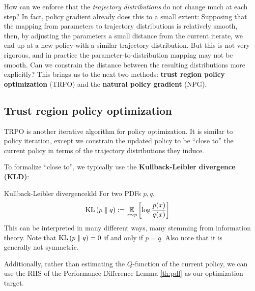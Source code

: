 \documentclass[\main/main]{subfiles}
\begin{document}
How can we enforce that the \emph{trajectory distributions} do not change much at each step?
In fact, policy gradient already does this to a small extent: Supposing that the mapping from parameters to trajectory distributions is relatively smooth, then, by adjusting the parameters a small distance from the current iterate, we end up at a new policy with a similar trajectory distribution.
But this is not very rigorous, and in practice the parameter-to-distribution mapping may not be smooth. Can we constrain the distance between the resulting distributions more explicitly?
This brings us to the next two methods: \textbf{trust region policy optimization} (TRPO) and the \textbf{natural policy gradient} (NPG).

\subsection{Trust region policy optimization}

TRPO is another iterative algorithm for policy optimization. It is similar to policy iteration, except we constrain the updated policy to be ``close to'' the current policy in terms of the trajectory distributions they induce.

To formalize ``close to'', we typically use the \textbf{Kullback-Leibler divergence (KLD)}:

\begin{definition}{Kullback-Leibler divergence}{kld}
    For two PDFs $p, q$,
    \begin{equation}
        \mathrm{KL}\left(p \parallel q\right) := \operatorname*{\mathbb{E}}_{x \sim p} \left[ \log \frac{p(x)}{q(x)} \right]
    \end{equation}
    This can be interpreted in many different ways, many stemming from information theory.
    Note that $\mathrm{KL}\left(p \parallel q\right) = 0$ if and only if $p = q$. Also note that it is generally not symmetric.
\end{definition}



Additionally, rather than estimating the $Q$-function of the current policy, we can use the RHS of the Performance Difference Lemma \eqref{th:pdl} as our optimization target.
\end{document}

